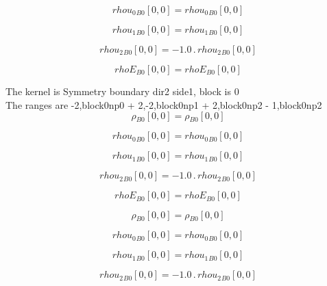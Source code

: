 \documentclass{article}
\begin{document}
\begin{dmath}{rhou_{0}{_{B0}}}[{0,0}] = {rhou_{0}{_{B0}}}[{0,0}]\end{dmath}

\begin{dmath}{rhou_{1}{_{B0}}}[{0,0}] = {rhou_{1}{_{B0}}}[{0,0}]\end{dmath}

\begin{dmath}{rhou_{2}{_{B0}}}[{0,0}] = - 1.0 \,.\, {rhou_{2}{_{B0}}}[{0,0}]\end{dmath}

\begin{dmath}{rhoE{_{B0}}}[{0,0}] = {rhoE{_{B0}}}[{0,0}]\end{dmath}

\noindent The kernel is Symmetry boundary dir2 side1, block is 0\\\noindent The ranges are -2,block0np0 + 2,-2,block0np1 + 2,block0np2 - 1,block0np2\\\begin{dmath}{\rho{_{B0}}}[{0,0}] = {\rho{_{B0}}}[{0,0}]\end{dmath}

\begin{dmath}{rhou_{0}{_{B0}}}[{0,0}] = {rhou_{0}{_{B0}}}[{0,0}]\end{dmath}

\begin{dmath}{rhou_{1}{_{B0}}}[{0,0}] = {rhou_{1}{_{B0}}}[{0,0}]\end{dmath}

\begin{dmath}{rhou_{2}{_{B0}}}[{0,0}] = - 1.0 \,.\, {rhou_{2}{_{B0}}}[{0,0}]\end{dmath}

\begin{dmath}{rhoE{_{B0}}}[{0,0}] = {rhoE{_{B0}}}[{0,0}]\end{dmath}

\begin{dmath}{\rho{_{B0}}}[{0,0}] = {\rho{_{B0}}}[{0,0}]\end{dmath}

\begin{dmath}{rhou_{0}{_{B0}}}[{0,0}] = {rhou_{0}{_{B0}}}[{0,0}]\end{dmath}

\begin{dmath}{rhou_{1}{_{B0}}}[{0,0}] = {rhou_{1}{_{B0}}}[{0,0}]\end{dmath}

\begin{dmath}{rhou_{2}{_{B0}}}[{0,0}] = - 1.0 \,.\, {rhou_{2}{_{B0}}}[{0,0}]\end{dmath}
\end{document}
